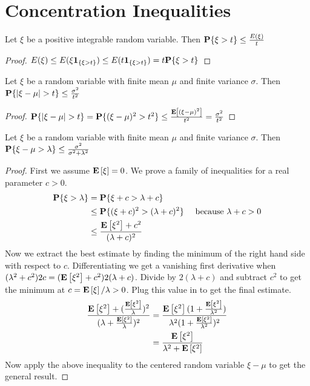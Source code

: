 \chapter{Concentration Inequalities}
\begin{lem}\label{MarkovInequality}Let $\xi$ be a positive integrable random variable.  Then $\textbf{P}\{\xi>t\} \leq \frac{E(\xi)}{t}$\end{lem}
\begin{proof}
$E(\xi) \leq E(\xi\textbf{1}_{\{\xi>t\}}) \leq E(t\textbf{1}_{\{\xi>t\}})=t\textbf{P}\{\xi>t\}$
\qedhere
\end{proof}

\begin{lem}\label{ChebInequality}Let $\xi$ be a random variable with finite mean $\mu$ and finite variance $\sigma$.  Then $\probability{|\xi-\mu|>t} \leq \frac{\sigma^2}{t^2}$\end{lem}
\begin{proof}
$\probability{|\xi-\mu|>t} = \probability{(\xi-\mu)^2 > t^2} \leq \frac{\expectation{(\xi-\mu)^2}}{t^2}=\frac{\sigma^2}{t^2}$
\qedhere
\end{proof}

\begin{lem}\label{OneSidedChebInequality}Let $\xi$ be a random variable with finite mean $\mu$ and
  finite variance $\sigma$.  Then $\textbf{P}\{\xi-\mu>\lambda\} \leq
  \frac{\sigma^2}{\sigma^2 + \lambda^2}$\end{lem}
\begin{proof}
First we assume $\textbf{E}\left[\xi\right]=0$.  We prove a family of
inequalities for a real parameter $c > 0$.
\begin{align*}
\textbf{P}\{\xi>\lambda\}  
&= \textbf{P}\{\xi + c > \lambda + c\} \\
& \leq \textbf{P}\{(\xi + c)^2 > (\lambda + c)^2\} & \textrm{ because }
\lambda+c>0 \\
& \leq \frac{\textbf{E}\left[\xi^2\right] + c^2}{(\lambda + c)^2}
\end{align*}
Now we extract the best estimate by finding the minimum of the right
hand side with respect to $c$.  Differentiating we get a vanishing
first derivative when
$
(\lambda^2 + c^2) 2c = (\textbf{E}\left[\xi^2\right] + c^2) 2(\lambda +
c)$.  Divide by $2(\lambda+ c)$  and subtract $c^2$ to get the
  minimum at $c=\textbf{E}\left[\xi\right]/\lambda > 0$.  Plug this value in to
  get the final estimate.
\begin{align*}
\frac{
  \textbf{E}\left[\xi^2\right] +
  (\frac{\textbf{E}\left[\xi^2\right]}{\lambda})^2
}
{(\lambda +
    \frac{\textbf{E}\left[\xi^2\right]}{\lambda})^2
} & =
    \frac{\textbf{E}\left[\xi^2\right](1 +
      \frac{\textbf{E}\left[\xi^2\right]}{\lambda^2})}
{
  \lambda^2 (1 + \frac{\textbf{E}\left[\xi^2\right]}{\lambda^2}
)^2
} \\
& = \frac{\textbf{E}\left[\xi^2\right]}{\lambda^2 + \textbf{E}\left[\xi^2\right]}
\end{align*}
Now apply the above inequality to the centered random variable $\xi -
\mu$ to get the general result.
\qedhere
\end{proof}

